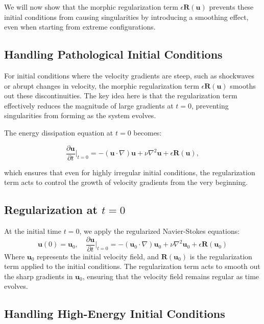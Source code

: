 \documentclass{article}
\begin{document}
We will now show that the morphic regularization term \( \epsilon \mathbf{R}(\mathbf{u}) \) prevents these initial conditions from causing singularities by introducing a smoothing effect, even when starting from extreme configurations.

\subsection*{Handling Pathological Initial Conditions}

For initial conditions where the velocity gradients are steep, such as shockwaves or abrupt changes in velocity, the morphic regularization term \( \epsilon \mathbf{R}(\mathbf{u}) \) smooths out these discontinuities. The key idea here is that the regularization term effectively reduces the magnitude of large gradients at \( t = 0 \), preventing singularities from forming as the system evolves.

The energy dissipation equation at \( t = 0 \) becomes:

\[
\frac{\partial \mathbf{u}}{\partial t} \Big|_{t=0} = - (\mathbf{u} \cdot \nabla)\mathbf{u} + \nu \nabla^2 \mathbf{u} + \epsilon \mathbf{R}(\mathbf{u}),
\]

which ensures that even for highly irregular initial conditions, the regularization term acts to control the growth of velocity gradients from the very beginning.

\subsection*{Regularization at \( t = 0 \)}

At the initial time \( t = 0 \), we apply the regularized Navier-Stokes equations:
\[
\mathbf{u}(0) = \mathbf{u}_0, \quad \frac{\partial \mathbf{u}}{\partial t}\Big|_{t=0} = -(\mathbf{u}_0 \cdot \nabla)\mathbf{u}_0 + \nu \nabla^2 \mathbf{u}_0 + \epsilon \mathbf{R}(\mathbf{u}_0)
\]
Where \( \mathbf{u}_0 \) represents the initial velocity field, and \( \mathbf{R}(\mathbf{u}_0) \) is the regularization term applied to the initial conditions. The regularization term acts to smooth out the sharp gradients in \( \mathbf{u}_0 \), ensuring that the velocity field remains regular as time evolves.

\subsection*{Handling High-Energy Initial Conditions}
\end{document}
